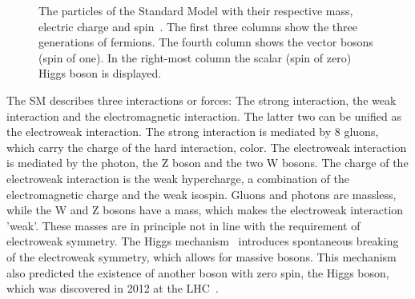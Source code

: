 \begin{figure}[htbp!]
  \begin{center}

\caption{The particles of the Standard Model with their respective mass, electric charge and spin~\cite{SMPart}. The first three columns show the three generations of fermions. 
The fourth column shows the vector bosons (spin of one). In the right-most column the scalar (spin of zero) Higgs boson is displayed.
  \label{fig:theo_part}}
  \end{center}
\end{figure}


The SM describes three interactions or forces: The strong interaction, the weak interaction and the electromagnetic interaction. The latter two can be unified as  the electroweak interaction.
The strong interaction is mediated by 8 gluons, which carry the charge of the hard interaction, color.
The electroweak interaction is mediated by the photon, the Z boson and the two W bosons. The charge of the electroweak interaction is the weak hypercharge, a combination of the electromagnetic
charge and the weak isospin. Gluons and photons are massless, while the W and Z bosons have a mass, which makes the electroweak interaction 'weak'. These masses are in principle not in line with the  requirement of electroweak symmetry.
The Higgs mechanism~\cite{HIGGS1964132,PhysRevLett.13.321,PhysRevLett.13.585} introduces spontaneous breaking of the electroweak symmetry, which allows for massive bosons.
This mechanism also predicted the existence of another boson with zero spin, the Higgs boson, which was discovered in 2012 at the LHC~\cite{201230,20121}.

